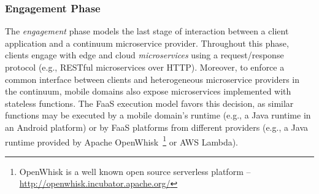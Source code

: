 \subsubsection*{Engagement Phase}\label{sec:A3-E-engagement}

The \textit{engagement} phase models the last stage of interaction between a client application and a continuum microservice provider. Throughout this phase, clients engage with edge and cloud \textit{microservices} using a request/response protocol (e.g., RESTful microservices over HTTP). Moreover, to enforce a common interface between clients and heterogeneous microservice providers in the continuum, mobile domains also expose microservices implemented with stateless functions. The FaaS execution model favors this decision, as similar functions may be executed by a mobile domain's runtime (e.g., a Java runtime in an Android platform) or by FaaS platforms from different providers (e.g., a Java runtime provided by Apache OpenWhisk~\footnote{OpenWhisk is a well known open source serverless platform -- \url{http://openwhisk.incubator.apache.org/}} or AWS Lambda).







